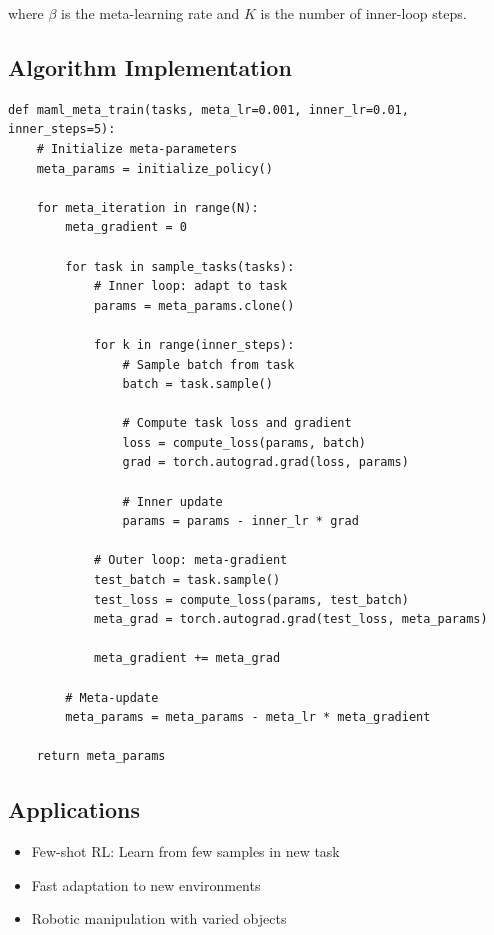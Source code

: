 \documentclass[12pt]{article}
\begin{document}
{{{where $\beta$ is the meta-learning rate and $K$ is the number of inner-loop steps.

\subsection{Algorithm Implementation}

\begin{verbatim}
def maml_meta_train(tasks, meta_lr=0.001, inner_lr=0.01, inner_steps=5):
    # Initialize meta-parameters
    meta_params = initialize_policy()
    
    for meta_iteration in range(N):
        meta_gradient = 0
        
        for task in sample_tasks(tasks):
            # Inner loop: adapt to task
            params = meta_params.clone()
            
            for k in range(inner_steps):
                # Sample batch from task
                batch = task.sample()
                
                # Compute task loss and gradient
                loss = compute_loss(params, batch)
                grad = torch.autograd.grad(loss, params)
                
                # Inner update
                params = params - inner_lr * grad
            
            # Outer loop: meta-gradient
            test_batch = task.sample()
            test_loss = compute_loss(params, test_batch)
            meta_grad = torch.autograd.grad(test_loss, meta_params)
            
            meta_gradient += meta_grad
        
        # Meta-update
        meta_params = meta_params - meta_lr * meta_gradient
    
    return meta_params
\end{verbatim}

\subsection{Applications}

\begin{itemize}
\item Few-shot RL: Learn from few samples in new task
\item Fast adaptation to new environments
\item Robotic manipulation with varied objects
\end{itemize}

}}}
\end{document}
